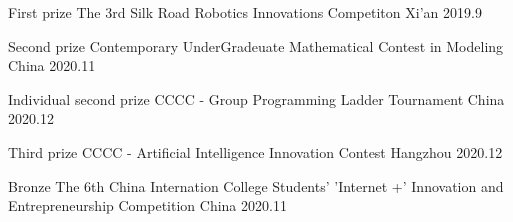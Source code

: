 \begin{cvhonors}

  \cvhonor
    {First prize} %
    {The 3rd Silk Road Robotics Innovations Competiton} %
    {Xi'an} %
    {2019.9} %

    
	\cvhonor
	{Second prize} %
	{Contemporary UnderGradeuate Mathematical Contest in Modeling} %
	{China} %
	{2020.11} %

	\cvhonor
	{Individual second prize} %
	{CCCC - Group Programming Ladder Tournament} %
	{China} %
	{2020.12} %

	\cvhonor
	{Third prize} %
	{CCCC - Artificial Intelligence Innovation Contest} %
	{Hangzhou} %
	{2020.12} %

	\cvhonor
	{Bronze} %
	{The 6th China Internation College Students' 'Internet +' Innovation and Entrepreneurship Competition} %
	{China} %
	{2020.11} %


\end{cvhonors}



